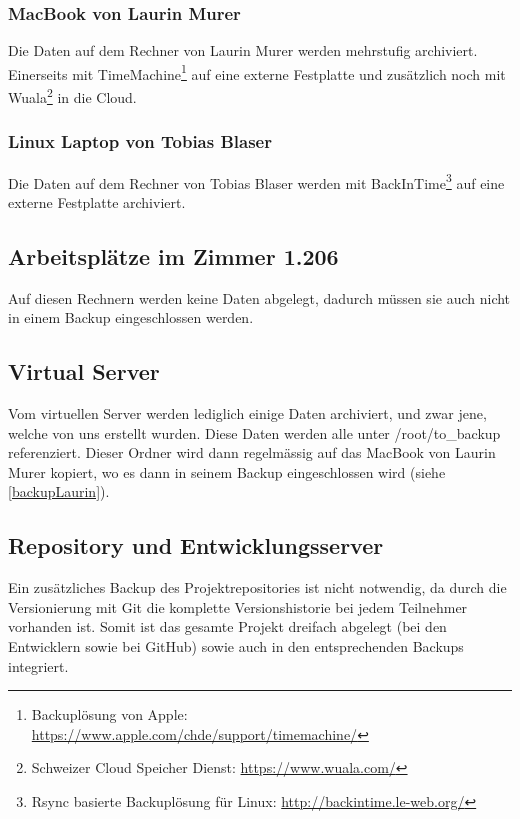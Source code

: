 			\subsubsection*{MacBook von Laurin Murer}\label{backupLaurin}
				Die Daten auf dem Rechner von Laurin Murer werden mehrstufig archiviert.
				Einerseits mit TimeMachine\footnote{Backuplösung von Apple: \url{https://www.apple.com/chde/support/timemachine/}} auf eine externe Festplatte und zusätzlich noch mit Wuala\footnote{Schweizer Cloud Speicher Dienst: \url{https://www.wuala.com/}} in die Cloud.

			\subsubsection*{Linux Laptop von Tobias Blaser}
				Die Daten auf dem Rechner von Tobias Blaser werden mit BackInTime\footnote{Rsync basierte Backuplösung für Linux: \url{http://backintime.le-web.org/}} auf eine externe Festplatte archiviert.
				
		\subsection*{Arbeitsplätze im Zimmer 1.206}
			Auf diesen Rechnern werden keine Daten abgelegt, dadurch müssen sie auch nicht in einem Backup eingeschlossen werden.

		\subsection*{Virtual Server}
			Vom virtuellen Server werden lediglich einige Daten archiviert, und zwar jene, welche von uns erstellt wurden.
			Diese Daten werden alle unter /root/to\_backup referenziert.
			Dieser Ordner wird dann regelmässig auf das MacBook von Laurin Murer kopiert, wo es dann in seinem Backup eingeschlossen wird (siehe \ref{backupLaurin}).
		
		\subsection*{Repository und Entwicklungsserver}
			Ein zusätzliches Backup des Projektrepositories ist nicht notwendig, da durch die Versionierung mit Git die komplette Versionshistorie bei jedem Teilnehmer vorhanden ist.
			Somit ist das gesamte Projekt dreifach abgelegt (bei den Entwicklern sowie bei GitHub) sowie auch in den entsprechenden Backups integriert.

